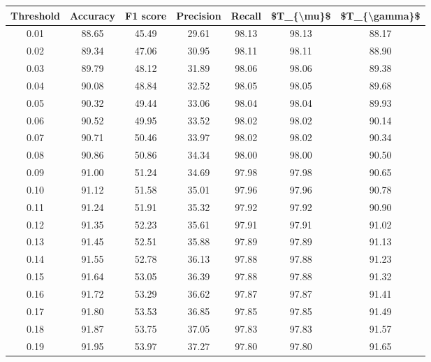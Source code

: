 \begin{tabular}{|c|c|c|c|c|c|c|}
\hline
 Threshold &  Accuracy &  F1 score &  Precision &  Recall &  \$T\_\{\textbackslash mu\}\$ &  \$T\_\{\textbackslash gamma\}\$ \\
\hline
      0.01 &     88.65 &     45.49 &      29.61 &   98.13 &      98.13 &         88.17 \\
      0.02 &     89.34 &     47.06 &      30.95 &   98.11 &      98.11 &         88.90 \\
      0.03 &     89.79 &     48.12 &      31.89 &   98.06 &      98.06 &         89.38 \\
      0.04 &     90.08 &     48.84 &      32.52 &   98.05 &      98.05 &         89.68 \\
      0.05 &     90.32 &     49.44 &      33.06 &   98.04 &      98.04 &         89.93 \\
      0.06 &     90.52 &     49.95 &      33.52 &   98.02 &      98.02 &         90.14 \\
      0.07 &     90.71 &     50.46 &      33.97 &   98.02 &      98.02 &         90.34 \\
      0.08 &     90.86 &     50.86 &      34.34 &   98.00 &      98.00 &         90.50 \\
      0.09 &     91.00 &     51.24 &      34.69 &   97.98 &      97.98 &         90.65 \\
      0.10 &     91.12 &     51.58 &      35.01 &   97.96 &      97.96 &         90.78 \\
      0.11 &     91.24 &     51.91 &      35.32 &   97.92 &      97.92 &         90.90 \\
      0.12 &     91.35 &     52.23 &      35.61 &   97.91 &      97.91 &         91.02 \\
      0.13 &     91.45 &     52.51 &      35.88 &   97.89 &      97.89 &         91.13 \\
      0.14 &     91.55 &     52.78 &      36.13 &   97.88 &      97.88 &         91.23 \\
      0.15 &     91.64 &     53.05 &      36.39 &   97.88 &      97.88 &         91.32 \\
      0.16 &     91.72 &     53.29 &      36.62 &   97.87 &      97.87 &         91.41 \\
      0.17 &     91.80 &     53.53 &      36.85 &   97.85 &      97.85 &         91.49 \\
      0.18 &     91.87 &     53.75 &      37.05 &   97.83 &      97.83 &         91.57 \\
      0.19 &     91.95 &     53.97 &      37.27 &   97.80 &      97.80 &         91.65 \\

\end{tabular}
